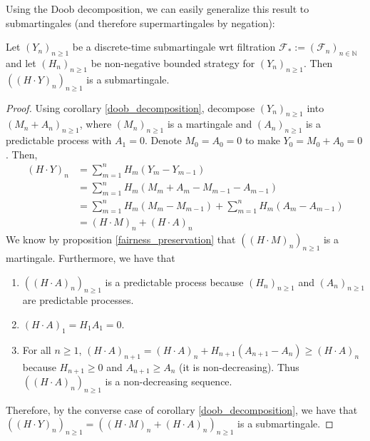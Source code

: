 Using the Doob decomposition, we can easily generalize this result to submartingales (and therefore supermartingales by negation):

\begin{corollary}
    \label{favorability_preservation}
    Let $(Y_{n})_{n \geq 1}$ be a discrete-time submartingale wrt filtration $\mathcal{F}_{*} := (\mathcal{F}_{n})_{n \in \mathbb{N}}$ and let \((H_{n})_{n \geq 1}\) be non-negative bounded strategy for \((Y_{n})_{n \geq 1}\). Then \(((H \cdot Y)_{n})_{n \geq 1}\) is a submartingale.
\end{corollary}
    
\begin{proof}
    Using corollary \ref{doob_decomposition}, decompose \((Y_{n})_{n \geq 1}\) into \((M_{n} + A_{n})_{n \geq 1}\), where \((M_{n})_{n \geq 1}\) is a martingale and \((A_{n})_{n \geq 1}\) is a predictable process with \(A_{1} = 0\). Denote \(M_{0} = A_{0} = 0\) to make \(Y_{0} = M_{0} + A_{0} = 0\). Then,
    \begin{align*}
        (H \cdot Y)_{n} &= \sum\limits_{m=1}^{n}H_{m}(Y_{m} - Y_{m-1}) \\
        &= \sum\limits_{m=1}^{n}H_{m}(M_{m} + A_{m} - M_{m-1} - A_{m-1}) \\
        &= \sum\limits_{m=1}^{n}H_{m}(M_{m} - M_{m-1}) + \sum\limits_{m=1}^{n}H_{m}( A_{m}  - A_{m-1}) \\
        &= (H \cdot M)_{n} + (H \cdot A)_{n}
    \end{align*}
    We know by proposition \ref{fairness_preservation} that \(((H \cdot M)_{n})_{n \geq 1}\) is a martingale. Furthermore, we have that 
    \begin{enumerate}
        \item \(((H \cdot A)_{n})_{n \geq 1}\) is a predictable process because  \((H_{n})_{n \geq 1}\) and \((A_{n})_{n \geq 1}\) are predictable processes.
        \item \((H \cdot A)_{1} = H_{1} A_{1} = 0\).
        \item For all \(n \geq 1\), \((H \cdot A)_{n+1} = (H \cdot A)_{n} + H_{n+1} (A_{n+1} - A_{n}) \geq (H \cdot A)_{n}\) because \(H_{n+1} \geq 0\) and \(A_{n+1} \geq A_{n}\) (it is non-decreasing). Thus \(((H \cdot A)_{n})_{n \geq 1}\) is a non-decreasing sequence. 
    \end{enumerate}

    Therefore, by the converse case of corollary \ref{doob_decomposition}, we have that  \(((H \cdot Y)_{n})_{n \geq 1} = ( (H \cdot M)_{n} + (H \cdot A)_{n})_{n \geq 1}\) is a submartingale.
\end{proof}

